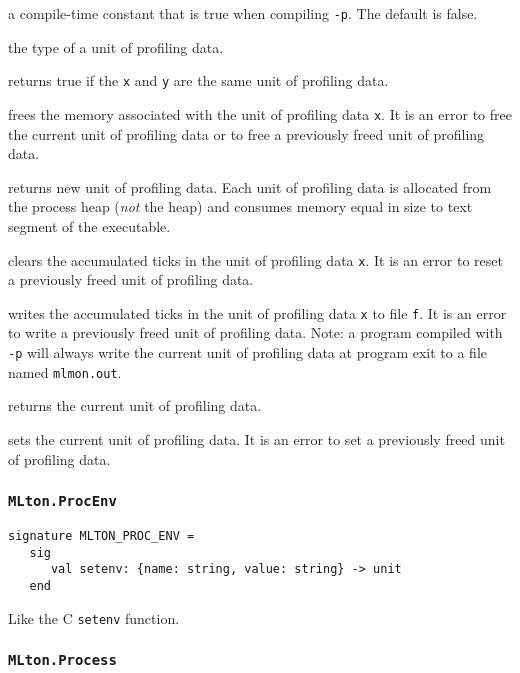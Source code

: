 \begin{description}

a compile-time constant that is true when compiling {\tt -p}.  The
default is false.

 the type of a unit of profiling data.

returns true if the {\tt x} and {\tt y} are the same unit of profiling
data.

frees the memory associated with the unit of profiling data {\tt x}.
It is an error to free the current unit of profiling data or to free a
previously freed unit of profiling data.

returns new unit of profiling data.  Each unit of profiling data is
allocated from the process heap (\emph{not} the \mlton heap) and
consumes memory equal in size to text segment of the executable.

clears the accumulated ticks in the unit of profiling data {\tt x}.
It is an error to reset a previously freed unit of profiling data.

writes the accumulated ticks in the unit of profiling data {\tt x} to
file {\tt f}.  It is an error to write a previously freed unit of
profiling data.  Note: a program compiled with {\tt -p} will always
write the current unit of profiling data at program exit to a file
named {\tt mlmon.out}.

returns the current unit of profiling data.

sets the current unit of profiling data.  It is an error to set a
previously freed unit of profiling data.  

\end{description}

\subsubsection{\tt MLton.ProcEnv}
\begin{verbatim}
signature MLTON_PROC_ENV =
   sig
      val setenv: {name: string, value: string} -> unit
   end
\end{verbatim}

\begin{description}
Like the C {\tt setenv} function.
\end{description}

\subsubsection{\tt MLton.Process}

